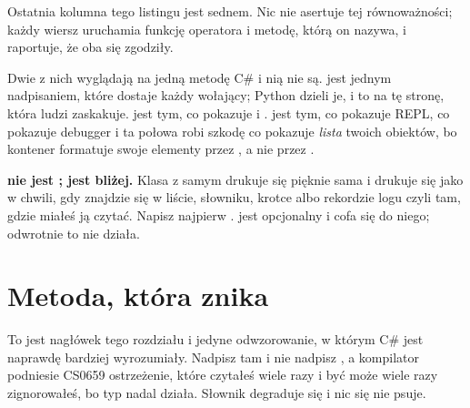 

\noindent
Ostatnia kolumna tego listingu jest sednem. Nic nie asertuje tej
równoważności; każdy wiersz uruchamia funkcję operatora i metodę, którą on
nazywa, i raportuje, że oba się zgodziły.

Dwie z nich wyglądają na jedną metodę C\# i nią nie są. 
jest jednym nadpisaniem, które dostaje każdy wołający; Python dzieli je, i
to na tę stronę, która ludzi zaskakuje.  jest tym, co
pokazuje  i .  jest tym, co
pokazuje REPL, co pokazuje debugger i \dash{} ta połowa robi szkodę
\dash{} co pokazuje \emph{lista} twoich obiektów, bo kontener formatuje
swoje elementy przez , a nie przez .



\begin{trapbox}
\textbf{ nie jest ; 
jest bliżej.} Klasa z samym  drukuje się pięknie sama i
drukuje się jako  w chwili, gdy
znajdzie się w liście, słowniku, krotce albo rekordzie logu \dash{} czyli
tam, gdzie miałeś ją czytać. Napisz najpierw .
 jest opcjonalny i cofa się do niego; odwrotnie to nie
działa.
\end{trapbox}

\section{Metoda, która znika}
\label{sec:ch04-equality}

To jest nagłówek tego rozdziału i jedyne odwzorowanie, w którym C\# jest
naprawdę bardziej wyrozumiały. Nadpisz tam  i nie nadpisz
, a kompilator podniesie CS0659 \dash{} ostrzeżenie,
które czytałeś wiele razy i być może wiele razy zignorowałeś, bo typ nadal
działa. Słownik degraduje się i nic się nie psuje.

